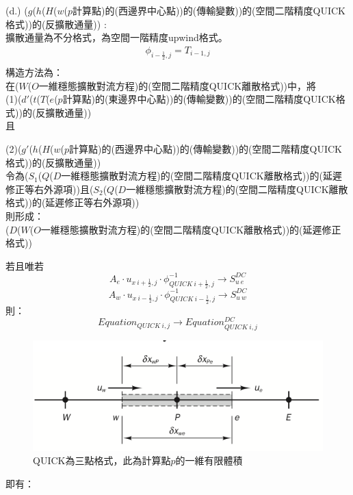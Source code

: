 \documentclass[12pt]{article}
\begin{document}
\noindent (d.) ($g$($h$($H$($w$($p$計算點)的(西邊界中心點))的(傳輸變數))的(空間二階精度QUICK格式))的(反擴散通量)) : \\
\noindent *擴散通量為不分格式，為空間一階精度upwind格式。\\
\begin{equation}
    \begin{split}
        \phi_{ i-\frac{1}{2},j}= T_{i-1,j} \\
    \end{split}
\end{equation}
\noindent 構造方法為：\\

在($W$($O$一維穩態擴散對流方程)的(空間二階精度QUICK離散格式))中，將\\

(1)($d'$($t$($T$($e$($p$計算點)的(東邊界中心點))的(傳輸變數))的(空間二階精度QUICK格式))的(反擴散通量))\\且

(2)($g'$($h$($H$($w$($p$計算點)的(西邊界中心點))的(傳輸變數))的(空間二階精度QUICK格式))的(反擴散通量))\\

令為($S_{1}$($Q$($D$一維穩態擴散對流方程)的(空間二階精度QUICK離散格式))的(延遲修正等右外源項))且($S_{2}$($Q$($D$一維穩態擴散對流方程)的(空間二階精度QUICK離散格式))的(延遲修正等右外源項))\\
則形成：\\

($D$($W$($O$一維穩態擴散對流方程)的(空間二階精度QUICK離散格式))的(延遲修正格式))

\begin{center}
    若且唯若$$A_{e}\cdot u_{x\ i+\frac{1}{2},j}\cdot \phi_{QUICK\ i+\frac{1}{2},j}^{-1} \rightarrow S_{u\ e
    }^{DC}$$ 
    $$A_{w}\cdot u_{x\ i-\frac{1}{2},j}\cdot \phi_{QUICK\ i-\frac{1}{2},j}^{-1} \rightarrow S_{u\ w}^{DC}$$
    則：$$Equation_{QUICK\ i,j} \rightarrow Equation_{QUICK\ i,j}^{DC}$$
\end{center}
\begin{figure}[H]
  \centering
  \includegraphics[scale = 1.2]{9.png}
  \caption{QUICK為三點格式，此為計算點$p$的一維有限體積}
  \label{fig:finite volume}
\end{figure}
\noindent 即有：\\
\end{document}
